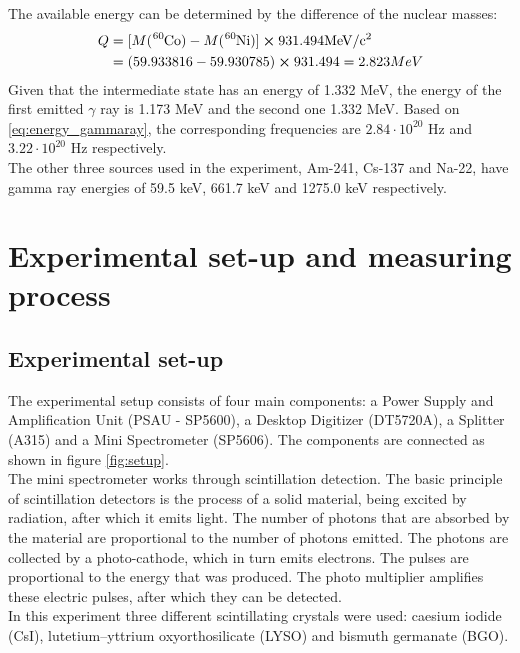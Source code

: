 \documentclass[a4paper, 11pt, table]{article}
\begin{document}
The available energy can be determined by the difference of the nuclear masses:
\begin{align*}
    Q & = [M(\ce{^{60}Co})  - M(\ce{^{60}Ni})]\cross 931.494 \mathrm{MeV/c^2} \\
      & = (59.933816 - 59.930785)\cross 931.494 = 2.823 MeV
\end{align*}
Given that the intermediate state has an energy of 1.332 MeV, the energy of the first emitted $\gamma$ ray is 1.173 MeV and the second one 1.332 MeV. Based on \cref{eq:energy_gammaray}, the corresponding frequencies are $2.84\cdot 10^{20}$ Hz and $3.22\cdot 10^{20}$ Hz respectively.\\
The other three sources used in the experiment, Am-241, Cs-137 and Na-22, have gamma ray energies of 59.5 keV, 661.7 keV and 1275.0 keV respectively.\cite{heath_scintillation_1964}




\section{Experimental set-up and measuring process}
\subsection{Experimental set-up}
The experimental setup consists of four main components: a Power Supply and Amplification Unit (PSAU - SP5600), a Desktop Digitizer (DT5720A), a Splitter (A315) and a Mini Spectrometer (SP5606). The components are connected as shown in figure \ref{fig:setup}. \\

The mini spectrometer works through scintillation detection. The basic principle of scintillation detectors is the process of a solid material, being excited by radiation, after which it emits light. The number of photons that are absorbed by the material are proportional to the number of photons emitted. The photons are collected by a photo-cathode, which in turn emits electrons. The pulses are proportional to the energy that was produced. The photo multiplier amplifies these electric pulses, after which they can be detected. \cite{KRAMAR19992467}\\

In this experiment three different scintillating crystals were used: caesium iodide (CsI), lutetium–yttrium oxyorthosilicate (LYSO) and bismuth germanate (BGO).\\
\end{document}

